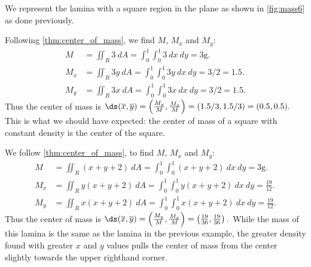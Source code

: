 {We represent the lamina with a square region in the plane as shown in \autoref{fig:mass6} as done previously. 

Following \autoref{thm:center_of_mass}, we find $M$, $M_x$ and $M_y$:
\begin{align*}
M &= \iint_R 3\ dA = \int_0^1\int_0^1 3\ dx\ dy =3\text{g}.\\
M_x &= \iint_R 3y\ dA = \int_0^1\int_0^1 3y\ dx\ dy =3/2 = 1.5.\\
M_y &= \iint_R 3x\ dA = \int_0^1\int_0^1 3x\ dx\ dy =3/2 = 1.5.
\end{align*}
Thus the center of mass is $\ds (\overline{x},\overline{y}) = \left(\frac{M_y}M,\frac{M_x}M\right) = (1.5/3,1.5/3) = (0.5,0.5).$ This is what we should have expected: the center of mass of a square with constant density is the center of the square.}

{We follow \autoref{thm:center_of_mass}, to find $M$, $M_x$ and $M_y$:
\begin{align*}
M &= \iint_R (x+y+2)\ dA = \int_0^1\int_0^1 (x+y+2)\ dx\ dy =3\text{g}.\\
M_x &= \iint_R y(x+y+2)\ dA = \int_0^1\int_0^1 y(x+y+2)\ dx\ dy =\frac{19}{12}.\\
M_y &= \iint_R x(x+y+2)\ dA = \int_0^1\int_0^1 x(x+y+2)\ dx\ dy =\frac{19}{12}.
\end{align*}
Thus the center of mass is $\ds (\overline{x},\overline{y}) = \left(\frac{M_y}M,\frac{M_x}M\right) = \left(\frac{19}{36},\frac{19}{36}\right)%
.$ While the mass of this lamina is the same as the lamina in the previous example, the greater density found with greater $x$ and $y$ values pulls the center of mass from the center slightly towards the upper righthand corner.}

